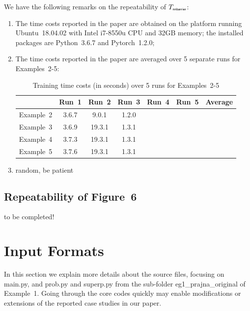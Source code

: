 \documentclass{llncs}
\begin{document}
We have the following remarks on the repeatability of $T_{\textsf{\tiny nnbarrier}}$:
\begin{enumerate}
    \item The time costs reported in the paper are obtained on the platform running Ubuntu~18.04.02 with Intel i7-8550u
            CPU and 32GB memory; the installed packages are \textsf{\small Python~3.6.7} and \textsf{\small Pytorch~1.2.0};
    \item The time costs reported in the paper are averaged over 5 separate runs for Examples~2-5:
    \begin{table}
        \centering
        \caption{Training time costs (in \textsf{seconds}) over 5 runs for Examples~2-5}
        \label{tbl:platform}
        \begin{tabular}{|c|c|c|c|c|c|c|} 
            \hline                  & Run~1     & Run~2     & Run~3   & Run~4 & Run~5 & Average \\ 
            \hline Example~2        & 3.6.7     & 9.0.1     & 1.2.0   &       &       &  \\ 
            \hline Example~3        & 3.6.9     & 19.3.1    & 1.3.1   &       &       &     \\ 
            \hline Example~4        & 3.7.3     & 19.3.1    & 1.3.1   &       &       &  \\
            \hline Example~5        & 3.7.6     & 19.3.1    & 1.3.1   &       &       &   \\ 
            \hline
        \end{tabular}
    \end{table}
    \item random, be patient
\end{enumerate}

\subsection{Repeatability of Figure~6}
to be completed!

\section{Input Formats}

In this section we explain more details about the source files, focusing on \textsf{main.py}, and \textsf{prob.py} and \textsf{superp.py} from the sub-folder
{\color{blue}\textsf{eg1\_prajna\_original}} of Example~1. Going through the core codes quickly may enable modifications or extensions of
the reported case studies in our paper.
\end{document}
